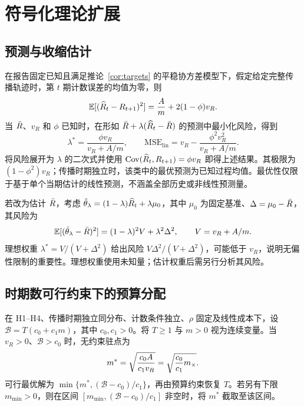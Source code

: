 \section{符号化理论扩展}
\label{app:extensions}

\subsection{预测与收缩估计}
\label{app:forecast}
\label{app:shrinkage}

在报告固定已知且满足推论~\ref{cor:targets} 的平稳协方差模型下，假定给定完整传播轨迹时，第 $t$ 期计数误差的均值为零，则
\begin{equation}
 \mathbb{E}[(\widehat R_t-R_{t+1})^2]=\frac{A}{m}+2(1-\phi)v_R.
\end{equation}
当 $\bar R$、$v_R$ 和 $\phi$ 已知时，在形如 $\bar R+\lambda(\widehat R_t-\bar R)$ 的预测中最小化风险，得到
\begin{equation}
 \lambda^*=\frac{\phi v_R}{v_R+A/m},\qquad
 \mathrm{MSE}_{\mathrm{lin}}=v_R-\frac{\phi^2v_R^2}{v_R+A/m}.
 \label{eq:forecast}
\end{equation}
将风险展开为 $\lambda$ 的二次式并使用 $\mathrm{Cov}(\widehat R_t,R_{t+1})=\phi v_R$ 即得上述结果。其极限为 $(1-\phi^2)v_R$；传播时期独立时，该类中的最优预测为已知过程均值。最优性仅限于基于单个当期估计的线性预测，不涵盖全部历史或非线性预测量。

若改为估计 $\bar R$，考虑 $\hat\theta_\lambda=(1-\lambda)\widehat R_t+\lambda\mu_0$，其中 $\mu_0$ 为固定基准、$\Delta=\mu_0-\bar R$，其风险为
\begin{equation}
 \mathbb{E}[(\hat\theta_\lambda-\bar R)^2]=(1-\lambda)^2V+\lambda^2\Delta^2,
 \qquad V=v_R+A/m.
\end{equation}
理想权重 $\lambda^*=V/(V+\Delta^2)$ 给出风险 $V\Delta^2/(V+\Delta^2)$，可能低于 $v_R$，说明无偏性限制的重要性。理想权重使用未知量；估计权重后需另行分析其风险。

\subsection{时期数可行约束下的预算分配}
\label{app:allocation}

\begin{proposition}[预算分配的连续松弛]
\label{prop:allocation}
\label{app:prop3}
在 H1--H4、传播时期独立同分布、计数条件独立、$\rho$ 固定及线性成本下，设 $\mathcal B=T(c_0+c_1m)$，其中 $c_0,c_1>0$。将 $T\ge1$ 与 $m>0$ 视为连续变量。当 $v_R>0$、$\mathcal B>c_0$ 时，无约束驻点为
\begin{equation}
 m^*=\sqrt{\frac{c_0A}{c_1v_R}}=\sqrt{\frac{c_0}{c_1}m_{\times}}.
 \label{eq:optimal-m}
\end{equation}
可行最优解为 $\min\{m^*,(\mathcal B-c_0)/c_1\}$，再由预算约束恢复 $T$。若另有下限 $m_{\min}>0$，则在区间 $[m_{\min},(\mathcal B-c_0)/c_1]$ 非空时，将 $m^*$ 截取至该区间。
\end{proposition}

